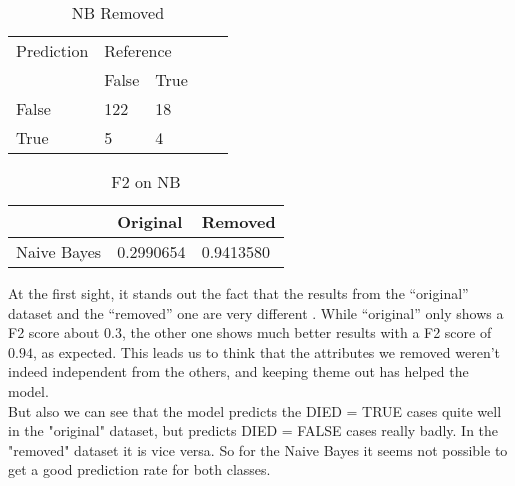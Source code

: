 \begin{table}[!htbp]
\centering
\caption{NB Removed}
\vspace{0.1cm}
\label{nb-remov}
\begin{tabular}{|l|ll|ll}
\cline{1-3}
Prediction & \multicolumn{2}{l|}{Reference} &  &  \\
           & False          & True          &  &  \\ \cline{2-3}
False      & 122              & 18             &  &  \\
True       & 5              & 4             &  &  \\ \cline{1-3}
\end{tabular}
\end{table}

\begin{table}[!htbp]
\centering
\caption{F2 on NB}
\vspace{0.1cm}
\label{nb-f2}
\begin{tabular}{|l|l|l|}
\hline
      & Original & Removed \\ \hline
Naive Bayes & 0.2990654  & 0.9413580       \\ \hline
\end{tabular}
\end{table}


At the first sight, it stands out the fact that the results from the ``original'' dataset and the ``removed'' one are very different . While ``original'' only shows a F2 score about $0.3$, the other one shows much better results with a F2 score of $0.94$, as expected. This leads us to think that the attributes we removed weren't indeed independent from the others, and keeping theme out has helped the model.\\
But also we can see that the model predicts the DIED = TRUE cases quite well in the "original" dataset, but predicts DIED = FALSE cases really badly. In the "removed" dataset it is vice versa. So for the Naive Bayes it seems not possible to get a good prediction rate for both classes.


